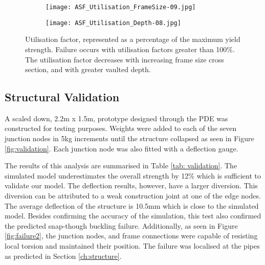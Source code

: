 \begin{figure}
    \centering
    \begin{subfigure}[b]{0.8\columnwidth}
        \texttt{[image: ASF\_Utilisation\_FrameSize-09.jpg]}
        \caption{} 
        \label{fig:frameSize}
    \end{subfigure} 
    \vspace{10mm}

    \begin{subfigure}[b]{0.8\columnwidth}
        \texttt{[image: ASF\_Utilisation\_Depth-08.jpg]}
        \caption{}
        \label{fig:StructuralDepth}
    \end{subfigure}
    \hfill

    \caption{Utilisation factor, represented as a percentage of the maximum yield strength. Failure occurs with utilisation factors greater than 100\%. The utilisation factor decreases with increasing frame size cross section, and with greater vaulted depth.}
    \label{fig:utilisation}
\end{figure}

\subsection{Structural Validation}

A scaled down, 2.2m x 1.5m, prototype designed through the PDE was constructed for testing purposes. Weights were added to each of the seven junction nodes in 5kg increments until the structure collapsed as seen in Figure \ref{fig:validation}. Each junction node was also fitted with a deflection gauge.

The results of this analysis are summarised in Table \ref{tab: validation}. The simulated model underestimates the overall strength by 12\% which is sufficient to validate our model. The deflection results, however, have a larger diversion. This diversion can be attributed to a weak construction joint at one of the edge nodes. The average deflection of the structure is 10.5mm which is close to the simulated model. Besides confirming the accuracy of the simulation, this test also confirmed the predicted snap-though buckling failure. Additionally, as seen in Figure \ref{fig:failure2}, the junction nodes, and frame connections were capable of resisting local torsion and maintained their position. The failure was localised at the pipes as predicted in Section \ref{ch:structure}. 

